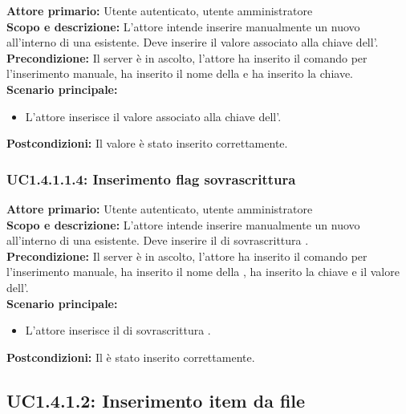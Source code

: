 \documentclass{scalatekids-article}
\begin{document}
\textbf{Attore primario:} Utente autenticato, utente amministratore\\
\textbf{Scopo e descrizione:} L'attore intende inserire manualmente un nuovo  all'interno di una  esistente. Deve inserire il valore associato alla chiave dell'.\\
\textbf{Precondizione:} Il server è in ascolto, l'attore ha inserito il comando per l'inserimento  manuale, ha inserito il nome della  e ha inserito la chiave.\\
\textbf{Scenario principale:}
\begin{itemize}
\item L'attore inserisce il valore associato alla chiave dell'.
\end{itemize}
\textbf{Postcondizioni:} Il valore è stato inserito correttamente.

\subsubsection{UC1.4.1.1.4: Inserimento flag sovrascrittura}

\textbf{Attore primario:} Utente autenticato, utente amministratore\\
\textbf{Scopo e descrizione:} L'attore intende inserire manualmente un nuovo  all'interno di una  esistente. Deve inserire il  di sovrascrittura .\\
\textbf{Precondizione:} Il server è in ascolto, l'attore ha inserito il comando per l'inserimento  manuale, ha inserito il nome della , ha inserito la chiave e il valore dell'.\\
\textbf{Scenario principale:}
\begin{itemize}
\item L'attore inserisce il  di sovrascrittura . %
\end{itemize}
\textbf{Postcondizioni:} Il  è stato inserito correttamente.

\subsection{UC1.4.1.2: Inserimento item da file}
\end{document}

